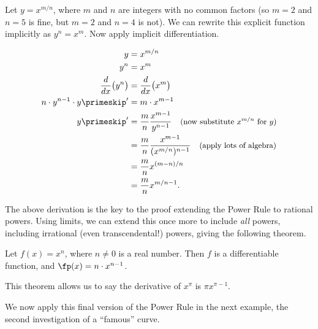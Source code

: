 Let $y = x^{m/n}$, where $m$ and $n$ are integers with no common factors (so $m=2$ and $n=5$ is fine, but $m=2$ and $n=4$ is not). We can rewrite this explicit function implicitly as $y^n = x^m$. Now apply implicit differentiation.

\begin{align*}
y &= x^{m/n} \\
y^n &= x^m \\
\frac{d}{dx}\big(y^n\big) &= \frac{d}{dx}\big(x^m\big) \\
n\cdot y^{n-1}\cdot y\primeskip' &= m\cdot x^{m-1} \\
y\primeskip' 	&= \frac{m}{n} \frac{x^{m-1}}{y^{n-1}} \quad \mbox{\small (now substitute $x^{m/n}$ for $y$)} \\
 		&= \frac{m}{n} \frac{x^{m-1}}{(x^{m/n})^{n-1}} \quad \mbox{\small (apply lots of algebra)}\\
		&= \frac{m}n x^{(m-n)/n}\\
		&= \frac{m}n x^{m/n -1}.
\end{align*}

The above derivation is the key to the proof extending the Power Rule to rational powers. Using limits, we can extend this once more to include \textit{all} powers, including irrational (even transcendental!) powers, giving the following theorem.

{Let $f(x) = x^n$, where $n\neq 0$ is a real number. Then $f$ is a differentiable function, and $\fp(x) = n\cdot x^{n-1}$.
}

This theorem allows us to say the derivative of $x^\pi$ is $\pi x^{\pi -1}$. 

We now apply this final version of the Power Rule in the next example, the second investigation of a ``famous'' curve.\\

